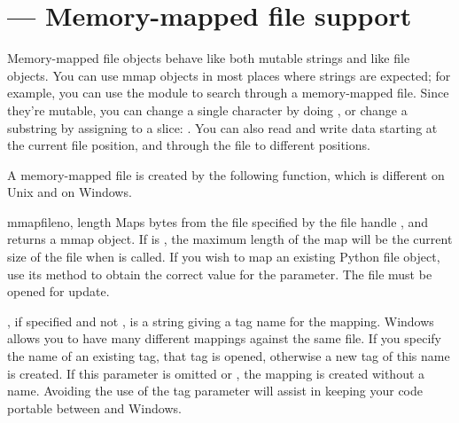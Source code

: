 \section{ ---
	Memory-mapped file support}


Memory-mapped file objects behave like both mutable strings and like
file objects.  You can use mmap objects in most places where strings
are expected; for example, you can use the  module to
search through a memory-mapped file.  Since they're mutable, you can
change a single character by doing , or
change a substring by assigning to a slice:
.  You can also read and write
data starting at the current file position, and 
through the file to different positions.

A memory-mapped file is created by the following function, which is
different on Unix and on Windows.

\begin{funcdesc}{mmap}{fileno, length}
  Maps  bytes from the file
specified by the file handle , and returns a mmap object.
If  is , the maximum length of the map will be the
current size of the file when  is called.
If you wish to map an existing Python file object, use its
 method to obtain the correct value for the
 parameter.  The file must be opened for update.

, if specified and not , is a string giving a
tag name for the mapping.  Windows allows you to have many different
mappings against the same file.  If you specify the name of an
existing tag, that tag is opened, otherwise a new tag of this name is
created.  If this parameter is omitted or , the mapping is
created without a name.  Avoiding the use of the tag parameter will
assist in keeping your code portable between \UNIX{} and Windows.
\end{funcdesc}

